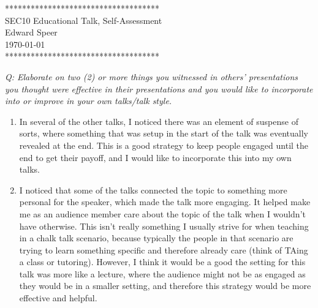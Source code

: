 \documentclass{article}
\begin{document}

    \begin{center}
        ************************************ \\
        SEC10 Educational Talk, Self-Assessment \\
        Edward Speer \\
        \today \\
        ************************************
    \end{center}

    \noindent \emph{Q: Elaborate on two (2) or more things you witnessed in others'
        presentations you thought were effective in their presentations and you
        would like to incorporate into or improve in your own talks/talk style.}

    \begin{enumerate}
    
        \item In several of the other talks, I noticed there was an element of
              suspense of sorts, where something that was setup in the start of
              the talk was eventually revealed at the end. This is a good
              strategy to keep people engaged until the end to get their payoff,
              and I would like to incorporate this into my own talks.
        
        \item I noticed that some of the talks connected the topic to something
              more personal for the speaker, which made the talk more engaging.
              It helped make me as an audience member care about the topic of
              the talk when I wouldn't have otherwise. This isn't really
              something I usually strive for when teaching in a chalk talk
              scenario, because typically the people in that scenario are trying
              to learn something specific and therefore already care (think of
              TAing a class or tutoring). However, I think it would be a good
              the setting for this talk was more like a lecture, where the
              audience might not be as engaged as they would be in a smaller
              setting, and therefore this strategy would be more effective
              and helpful.

    \end{enumerate}
\end{document}

